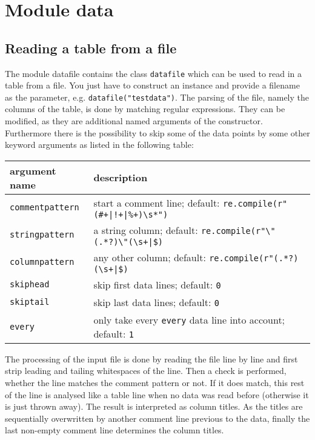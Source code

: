 \chapter{Module data}
\label{module:data}

\section{Reading a table from a file}

The module datafile contains the class \verb|datafile| which can be
used to read in a table from a file. You just have to construct an
instance and provide a filename as the parameter, e.g.
\verb|datafile("testdata")|. The parsing of the file, namely the
columns of the table, is done by matching regular expressions. They
can be modified, as they are additional named arguments of the
constructor. Furthermore there is the possibility to skip some of
the data points by some other keyword arguments as listed in the
following table:

\medskip
\begin{tabularx}{\linewidth}{l>{\raggedright\arraybackslash}X}
argument name&description\\
\hline
\texttt{commentpattern}&start a comment line; default: \texttt{re.compile(r"(\#+|!+|\%+)\textbackslash s*")}\\
\texttt{stringpattern}&a string column; default: \texttt{re.compile(r"\textbackslash"(.*?)\textbackslash"(\textbackslash s+|\$)}\\
\texttt{columnpattern}&any other column; default: \texttt{re.compile(r"(.*?)(\textbackslash s+|\$)}\\
\texttt{skiphead}&skip first data lines; default: \texttt{0}\\
\texttt{skiptail}&skip last data lines; default: \texttt{0}\\
\texttt{every}&only take every \texttt{every} data line into account; default: \texttt{1}
\end{tabularx}
\medskip

The processing of the input file is done by reading the file line by
line and first strip leading and tailing whitespaces of the line. Then
a check is performed, whether the line matches the comment pattern or
not. If it does match, this rest of the line is analysed like a table
line when no data was read before (otherwise it is just thrown away).
The result is interpreted as column titles. As the titles are
sequentially overwritten by another comment line previous to the data,
finally the last non-empty comment line determines the column titles.

